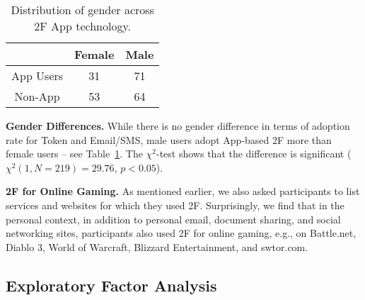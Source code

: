 \documentclass[conference]{IEEEtran}
\newcommand{\descr}[1]{\vspace{0.25cm} \noindent \textbf{#1}}
\begin{document}
\begin{table}[ttt]
\begin{center}
\small
\begin{tabular}{| c | c | c |}
  \hline                        
   & \textbf{Female} & \textbf{Male} \\
  \hline    
  App Users & 31 & 71 \\\hline  
  Non-App & 53 & 64 \\\hline  
\end{tabular}
\end{center}
\vspace{0.1cm}
\caption{Distribution of gender across 2F App technology.}\label{tab:gender}
 \end{table}
 
\descr{Gender Differences.}
While there is no gender difference in terms of adoption rate for Token and Email/SMS, male users adopt App-based 2F more than female users -- see Table~\ref{tab:gender}. The $\chi^2$-test shows that the difference is significant ($\chi^2(1, N=219)=29.76$, $p<0.05$).



\descr{2F for Online Gaming.}
As mentioned earlier, we also asked participants to list services and websites for which they used 2F. Surprisingly, we find that in the personal context, in addition to personal email, document sharing, and social networking sites, participants also used 2F for online gaming, e.g., on Battle.net, Diablo 3, World of Warcraft, Blizzard Entertainment, and swtor.com.







\subsection{Exploratory Factor Analysis}
\end{document}
